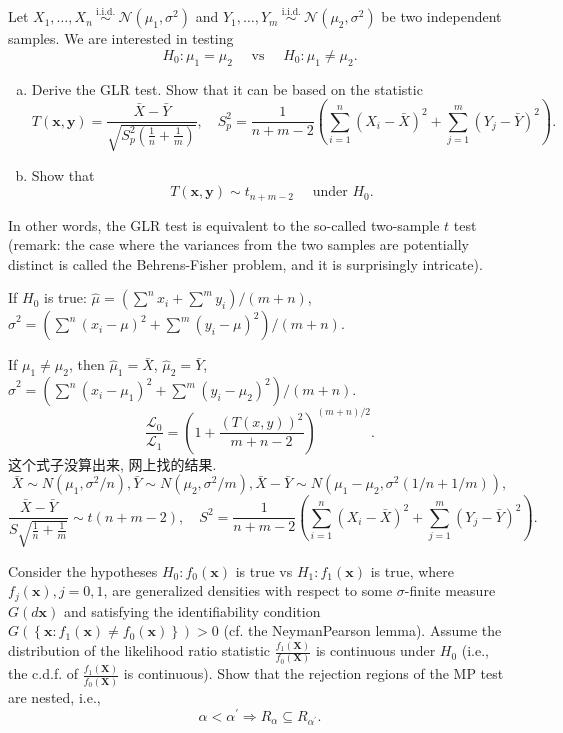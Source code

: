 \begin{ex}
    Let \(X_{1}, \ldots, X_{n} \stackrel{\text { i.i.d. }}{\sim} \mathcal{N}\left(\mu_{1}, \sigma^{2}\right)\) and \(Y_{1}, \ldots, Y_{m} \stackrel{\text { i.i.d. }}{\sim} \mathcal{N}\left(\mu_{2}, \sigma^{2}\right)\) be two independent samples. We are interested in testing
    \[
        H_{0}: \mu_{1}=\mu_{2} \quad \text { vs } \quad H_{0}: \mu_{1} \neq \mu_{2} .
    \]
    \begin{enumerate}[(a)]
        \item Derive the GLR test. Show that it can be based on the statistic
        \[
            T(\mathbf{x}, \mathbf{y})=\frac{\bar{X}-\bar{Y}}{\sqrt{S_{p}^{2}\left(\frac{1}{n}+\frac{1}{m}\right)}}, \quad S_{p}^{2}=\frac{1}{n+m-2}\left(\sum_{i=1}^{n}\left(X_{i}-\bar{X}\right)^{2}+\sum_{j=1}^{m}\left(Y_{j}-\bar{Y}\right)^{2}\right). 
        \]
        \item Show that
        \[
            T(\mathbf{x}, \mathbf{y}) \sim t_{n+m-2} \quad \text { under } H_{0} .
        \]
    \end{enumerate}
    In other words, the GLR test is equivalent to the so-called two-sample \(t\) test (remark: the case where the variances from the two samples are potentially distinct is called the Behrens-Fisher problem, and it is surprisingly intricate). 
\end{ex}

\begin{solution}
    If $H_0$ is true: 
    $\hat{\mu}=(\sum^nx_i+\sum^my_i)/(m+n)$, $\hat{\sigma}^2=(\sum^n(x_i-\mu)^2+\sum^m(y_i-\mu)^2)/(m+n)$. 

    \noindent If $\mu_1\neq\mu_2$, then $\hat{\mu}_1=\bar{X}$, $\hat{\mu}_2=\bar{Y}$, $\hat{\sigma}^2=(\sum^n(x_i-\mu_1)^2+\sum^m(y_i-\mu_2)^2)/(m+n)$. 
    \[
        \frac{\mathcal{L}_0}{\mathcal{L}_1}=\left(1+\frac{(T(x,y))^2}{m+n-2}\right)^{(m+n)/2}. 
    \]
    这个式子没算出来, 网上找的结果. 
    \[
        \bar{X}\sim N(\mu_1, \sigma^2/n), 
        \bar{Y}\sim N(\mu_2, \sigma^2/m), \bar{X}-\bar{Y}\sim N(\mu_1-\mu_2, \sigma^2(1/n+1/m)),
    \]
    \[
        \frac{\bar{X}-\bar{Y}}{S\sqrt{\frac{1}{n}+\frac{1}{m}}}\sim t(n+m-2), \quad S^2=\frac{1}{n+m-2}\left(\sum_{i=1}^{n}\left(X_{i}-\bar{X}\right)^{2}+\sum_{j=1}^{m}\left(Y_{j}-\bar{Y}\right)^{2}\right). 
    \]
\end{solution}

\begin{ex}
    Consider the hypotheses
    \(H_{0}: f_{0}(\mathbf{x})\) is true vs \(H_{1}: f_{1}(\mathbf{x})\) is true,
    where \(f_{j}(\mathbf{x}), j=0,1\), are generalized densities with respect to some \(\sigma\)-finite measure \(G(d \mathbf{x})\) and satisfying the identifiability condition \(G\left(\left\{\mathbf{x}: f_{1}(\mathbf{x}) \neq f_{0}(\mathbf{x})\right\}\right)>0\) (cf. the NeymanPearson lemma). Assume the distribution of the likelihood ratio statistic \(\frac{f_{1}(\mathbf{X})}{f_{0}(\mathbf{X})}\) is continuous under \(H_{0}\) (i.e., the c.d.f. of \(\frac{f_{1}(\mathbf{X})}{f_{0}(\mathbf{X})}\) is continuous). Show that the rejection regions of the MP test are nested, i.e.,
    \[
        \alpha<\alpha^{\prime} \Rightarrow R_{\alpha} \subseteq R_{\alpha^{\prime}}. 
    \]
\end{ex}

